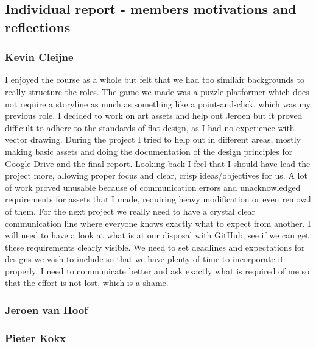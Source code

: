 \documentclass[a4paper,twoside,12pt]{article}
\begin{document}



\subsection{Individual report - members motivations and reflections}

\subsubsection{Kevin Cleijne}

I enjoyed the course as a whole but felt that we had too similair backgrounds to really structure the roles. The game we made was a puzzle platformer which does not require a storyline as much as something like a point-and-click, which was my previous role. I decided to work on art assets and help out Jeroen but it proved difficult to adhere to the standards of flat design, as I had no experience with vector drawing. During the project I tried to help out in different areas, mostly making basic assets and doing the documentation of the design principles for Google Drive and the final report. Looking back I feel that I should have lead the project more, allowing proper focus and clear, crisp ideas/objectives for us. A lot of work proved unusable because of communication errors and unacknowledged requirements for assets that I made, requiring heavy modification or even removal of them. For the next project we really need to have a crystal clear communication line where everyone knows exactly what to expect from another. I will need to have a look at what is at our disposal with GitHub, see if we can get these requirements clearly visible. We need to set deadlines and expectations for designs we wish to include so that we have plenty of time to incorporate it properly.
I need to communicate better and ask exactly what is required of me so that the effort is not lost, which is a shame.

\subsubsection{Jeroen van Hoof}


\subsubsection{Pieter Kokx}
\end{document}
